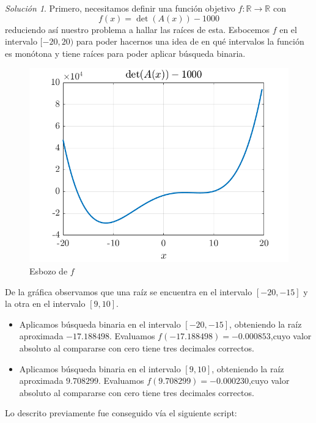 \documentclass{article}
\theoremstyle{definition}
\theoremstyle{remark}
\newtheorem*{solution}{Soluci\'on}
\newcommand{\BR}{\mathbb R}
\begin{document}
\begin{solution}
  Primero, necesitamos definir una funci\'on objetivo $f: \BR \to \BR$ con
  \[
    f(x) = \det(A(x)) - 1000
  \]
  reduciendo as\'i nuestro problema a hallar las ra\'ices de esta.
  Esbocemos $f$ en el intervalo $[-20, 20)$ para poder hacernos una idea de en
  qu\'e intervalos la funci\'on es mon\'otona y tiene ra\'ices para poder aplicar
  b\'usqueda binaria.

  \begin{figure}[H]
    \centering
    \includegraphics[scale=0.5]{graphics/plot.png}
    \caption{Esbozo de $f$}
  \end{figure}

  De la gr\'afica observamos que una ra\'iz se encuentra en el intervalo
  $[-20, -15]$ y la otra en el intervalo $[9, 10]$.
  \begin{itemize}
    \item Aplicamos b\'usqueda binaria en el intervalo $[-20, -15]$, obteniendo la
    ra\'iz aproximada $-17.188498$. Evaluamos $f(-17.188498) = -0.000853$,cuyo
    valor absoluto al compararse con cero tiene tres decimales correctos.
    \item Aplicamos b\'usqueda binaria en el intervalo $[9, 10]$, obteniendo la
    ra\'iz aproximada $9.708299$. Evaluamos $f(9.708299) = -0.000230$,cuyo
    valor absoluto al compararse con cero tiene tres decimales correctos.
  \end{itemize}

  Lo descrito previamente fue conseguido v\'ia el siguiente script:
  
\end{solution}
\end{document}
